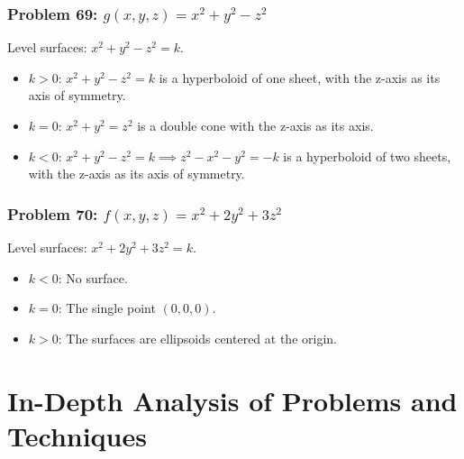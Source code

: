 \documentclass{article}
\begin{document}
\subsubsection{Problem 69: $g(x, y, z) = x^2 + y^2 - z^2$}
Level surfaces: $x^2 + y^2 - z^2 = k$.
\begin{itemize}
    \item $k > 0$: $x^2+y^2-z^2=k$ is a hyperboloid of one sheet, with the z-axis as its axis of symmetry.
    \item $k = 0$: $x^2+y^2=z^2$ is a double cone with the z-axis as its axis.
    \item $k < 0$: $x^2+y^2-z^2=k \implies z^2-x^2-y^2=-k$ is a hyperboloid of two sheets, with the z-axis as its axis of symmetry.
\end{itemize}

\subsubsection{Problem 70: $f(x, y, z) = x^2 + 2y^2 + 3z^2$}
Level surfaces: $x^2 + 2y^2 + 3z^2 = k$.
\begin{itemize}
    \item $k < 0$: No surface.
    \item $k = 0$: The single point $(0,0,0)$.
    \item $k > 0$: The surfaces are ellipsoids centered at the origin.
\end{itemize}

\section{In-Depth Analysis of Problems and Techniques}
\end{document}
